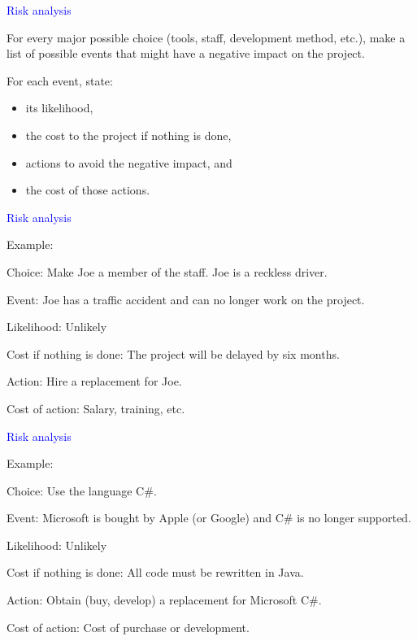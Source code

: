 \documentclass{slides}
\newcommand{\ti}[1]{\begin{center}\Large{\textcolor{blue}{#1}}\end{center}}
\begin{document}
\begin{slide}\ti{Risk analysis}

For every major possible choice (tools, staff, development method,
etc.), make a list of possible events that might have a negative
impact on the project.

For each event, state:

\begin{itemize}
\item its likelihood,
\item the cost to the project if nothing is done,
\item actions to avoid the negative impact, and
\item the cost of those actions.
\end{itemize}

\vfill\end{slide}
\begin{slide}\ti{Risk analysis}

Example:

Choice: Make Joe a member of the staff.  Joe is a reckless driver.

Event: Joe has a traffic accident and can no longer work on the
project.

Likelihood: Unlikely

Cost if nothing is done: The project will be delayed by six months.

Action: Hire a replacement for Joe.

Cost of action: Salary, training, etc.

\vfill\end{slide}
\begin{slide}\ti{Risk analysis}

Example:

Choice: Use the language C\#.

Event: Microsoft is bought by Apple (or Google) and C\# is no longer
supported.

Likelihood: Unlikely

Cost if nothing is done: All code must be rewritten in Java.

Action: Obtain (buy, develop) a replacement for Microsoft C\#.

Cost of action: Cost of purchase or development.

\vfill\end{slide}
\end{document}
